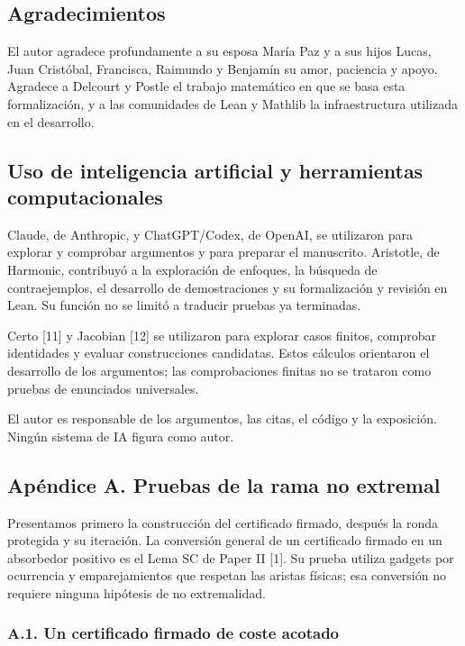 \documentclass[spanish,11pt,a4paper]{article}
\begin{document}
\subsection{Agradecimientos}\label{agradecimientos}

El autor agradece profundamente a su esposa María Paz y a sus hijos Lucas, Juan Cristóbal, Francisca, Raimundo y Benjamín su amor, paciencia y apoyo. Agradece a Delcourt y Postle el trabajo matemático en que se basa esta formalización, y a las comunidades de Lean y Mathlib la infraestructura utilizada en el desarrollo.

\subsection{Uso de inteligencia artificial y herramientas computacionales}\label{uso-de-inteligencia-artificial-y-herramientas-computacionales}

Claude, de Anthropic, y ChatGPT/Codex, de OpenAI, se utilizaron para explorar y comprobar argumentos y para preparar el manuscrito. Aristotle, de Harmonic, contribuyó a la exploración de enfoques, la búsqueda de contraejemplos, el desarrollo de demostraciones y su formalización y revisión en Lean. Su función no se limitó a traducir pruebas ya terminadas.

Certo {[}11{]} y Jacobian {[}12{]} se utilizaron para explorar casos finitos, comprobar identidades y evaluar construcciones candidatas. Estos cálculos orientaron el desarrollo de los argumentos; las comprobaciones finitas no se trataron como pruebas de enunciados universales.

El autor es responsable de los argumentos, las citas, el código y la exposición. Ningún sistema de IA figura como autor.

\subsection{Apéndice A. Pruebas de la rama no extremal}\label{apuxe9ndice-a.-pruebas-de-la-rama-no-extremal}

Presentamos primero la construcción del certificado firmado, después la ronda protegida y su iteración. La conversión general de un certificado firmado en un absorbedor positivo es el Lema SC de Paper II {[}1{]}. Su prueba utiliza gadgets por ocurrencia y emparejamientos que respetan las aristas físicas; esa conversión no requiere ninguna hipótesis de no extremalidad.

\subsubsection{A.1. Un certificado firmado de coste acotado}\label{a.1.-un-certificado-firmado-de-coste-acotado}
\end{document}

